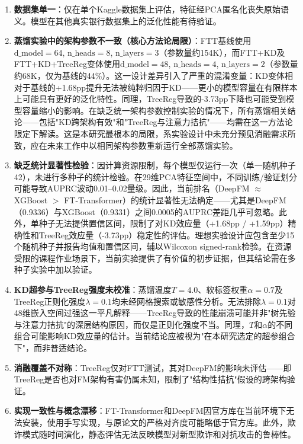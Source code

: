 \begin{enumerate}
    \item \textbf{数据集单一}：仅在单个Kaggle数据集上评估，特征经PCA匿名化丧失原始语义。模型在其他真实银行数据集上的泛化性能有待验证。
    \item \textbf{蒸馏实验中的架构参数不一致（核心方法论局限）}：FTT基线使用$\text{d\_model}{=}64$, $\text{n\_heads}{=}8$, $\text{n\_layers}{=}3$（参数量约154K），而FTT+KD及FTT+KD+TreeReg变体使用$\text{d\_model}{=}48$, $\text{n\_heads}{=}4$, $\text{n\_layers}{=}2$（参数量约68K，仅为基线的44\%）。这一设计差异引入了严重的混淆变量：KD变体相对于基线的+1.68pp提升无法被纯粹归因于KD——更小的模型容量在有限样本上可能具有更好的泛化特性。同理，TreeReg导致的-3.73pp下降也可能受到模型容量缩小的影响。在缺乏统一架构参数控制实验的情况下，所有蒸馏相关结论——包括"KD跨架构有效"和"TreeReg与注意力拮抗"——均需在这一方法论限定下解读。这是本研究最根本的局限，系实验设计中未充分预见消融需求所致，应在未来工作中以相同架构参数重新运行全部蒸馏实验。
    \item \textbf{缺乏统计显著性检验}：因计算资源限制，每个模型仅运行一次（单一随机种子42），未进行多种子的统计检验。在29维PCA特征空间中，不同训练/验证划分可能导致AUPRC波动0.01--0.02量级。因此，当前排名（DeepFM $\approx$ XGBoost $>$ FT-Transformer）的统计显著性无法确定——尤其是DeepFM（0.9336）与XGBoost（0.9331）之间0.0005的AUPRC差距几乎可忽略。此外，单种子无法提供置信区间，限制了对KD效应量（+1.68pp / +1.59pp）精确性和TreeReg效应量（-3.73pp）稳定性的评估。理想实验设计应包含至少15个随机种子并报告均值和置信区间，辅以Wilcoxon signed-rank检验\cite{grinsztajn2022tree}。在资源受限的课程作业场景下，当前实验提供了有价值的初步证据，但其结论需在多种子实验中加以验证。
    \item \textbf{KD超参与TreeReg强度未校准}：蒸馏温度$T{=}4.0$、软标签权重$\alpha{=}0.7$及TreeReg正则化强度$\lambda{=}0.1$均未经网格搜索或敏感性分析。无法排除$\lambda{=}0.1$对48维嵌入空间过强这一平凡解释——TreeReg导致的性能崩溃可能并非"树先验与注意力拮抗"的深层结构原因，而仅是正则化强度不当。同理，$T$和$\alpha$的不同组合可能影响KD效应量的估计。当前结论应被视为"在本研究选定的超参组合下"，而非普适结论。
    \item \textbf{消融覆盖不对称}：TreeReg仅对FTT测试，其对DeepFM的影响未评估——即TreeReg是否也对FM架构有害仍属未知，限制了"结构性拮抗"假设的跨架构验证。
    \item \textbf{实现一致性与概念漂移}：FT-Transformer和DeepFM因官方库在当前环境下无法安装，使用手写实现，与原论文的严格对齐度可能略低于官方库。此外，欺诈模式随时间演化，静态评估无法反映模型对新型欺诈和对抗攻击的鲁棒性。
\end{enumerate}


